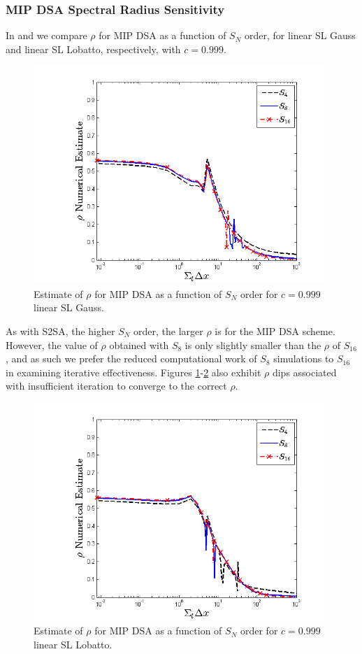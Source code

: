 \newpage

\subsubsection{MIP DSA Spectral Radius Sensitivity}


In  and  we compare $\rho$ for MIP DSA as a function of $S_N$ order, for linear SL Gauss and linear SL  Lobatto, respectively, with $c=0.999$.
\begin{figure}[!hbp]
\centering
\includegraphics[width=11cm]{chapter4_acceleration/Constant_XS_sn_comparions_MIP_Gauss.png}
\caption{Estimate of $\rho$ for MIP DSA as a function of  $S_N$ order for $c=0.999$ linear SL Gauss.}
\label{fig:mip_gauss_as_fun_sn}
\end{figure}
%
%
%
%
As with S2SA, the higher $S_N$ order, the larger $\rho$ is for the MIP DSA scheme. 
However, the value of $\rho$ obtained with $S_8$ is only slightly smaller than the $\rho$ of $S_{16}$, and as such we prefer the reduced computational work of $S_8$ simulations to $S_{16}$ in examining iterative effectiveness.  
Figures \ref{fig:mip_gauss_as_fun_sn}-\ref{fig:mip_lobatto_as_fun_sn} also exhibit $\rho$ dips associated with insufficient iteration to converge to the correct $\rho$.  
\vfill{}
\begin{figure}[!htp]
\centering
\includegraphics[width=11cm]{chapter4_acceleration/Constant_XS_sn_comparions_MIP_Lobatto.png}
\caption{Estimate of $\rho$ for MIP DSA as a function of  $S_N$ order for $c=0.999$ linear SL Lobatto.}
\label{fig:mip_lobatto_as_fun_sn}
\end{figure}
